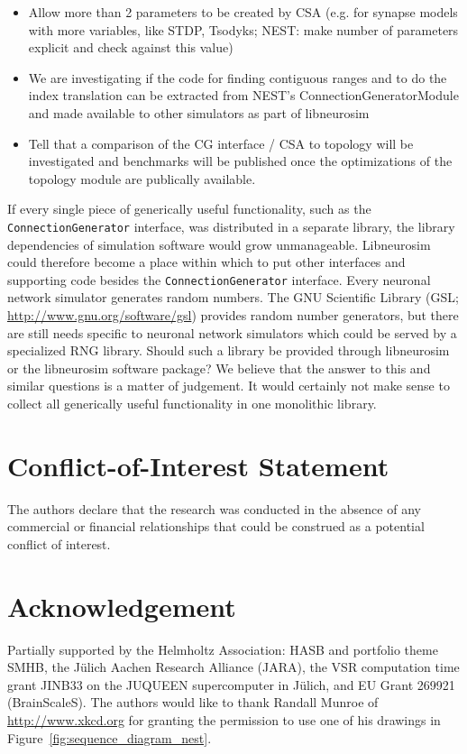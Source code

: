 \documentclass{frontiersSCNS} %
\begin{document}
\begin{itemize}
\item Allow more than 2 parameters to be created by CSA (e.g. for
  synapse models with more variables, like STDP, Tsodyks; NEST: make
  number of parameters explicit and check against this value)
\item We are investigating if the code for finding contiguous ranges
  and to do the index translation can be extracted from NEST's
  ConnectionGeneratorModule and made available to other simulators as
  part of libneurosim
\item Tell that a comparison of the CG interface / CSA to topology
  will be investigated and benchmarks will be published once the
  optimizations of the topology module are publically available.
\end{itemize}

If every single piece of generically useful functionality, such as the
\verb|ConnectionGenerator| interface, was distributed in a separate
library, the library dependencies of simulation software would grow
unmanageable.  Libneurosim could therefore become a place within which to put
other interfaces and supporting code besides the
\verb|ConnectionGenerator| interface.  Every neuronal network
simulator generates random numbers. The GNU Scientific Library (GSL;
\url{http://www.gnu.org/software/gsl}) provides random number
generators, but there are still needs specific to neuronal network
simulators which could be served by a specialized RNG library. Should
such a library be provided through libneurosim or the libneurosim
software package?  We believe that the answer to this and similar
questions is a matter of judgement. It would certainly not make sense
to collect all generically useful functionality in one monolithic
library.


\section*{Conflict-of-Interest Statement}
The authors declare that the research was conducted in the absence of
any commercial or financial relationships that could be construed as a
potential conflict of interest.

\section*{Acknowledgement}
Partially supported by the Helmholtz Association: HASB and portfolio
theme SMHB, the Jülich Aachen Research Alliance (JARA), the VSR
computation time grant JINB33 on the JUQUEEN supercomputer in Jülich,
and EU Grant 269921 (BrainScaleS). The authors would like to thank
Randall Munroe of \url{http://www.xkcd.org} for granting the permission to
use one of his drawings in Figure~\ref{fig:sequence_diagram_nest}.
\end{document}
